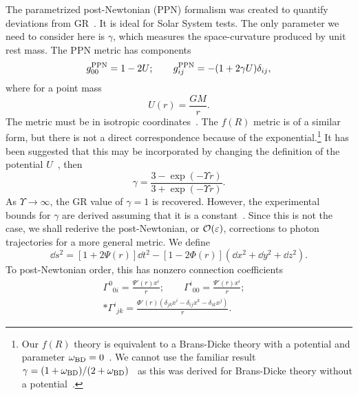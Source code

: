 The parametrized post-Newtonian (PPN) formalism was created to quantify deviations from GR~\cite{Will1993, Will2006}. It is ideal for Solar System tests. The only parameter we need to consider here is $\gamma$, which measures the space-curvature produced by unit rest mass. The PPN metric has components
\begin{equation}
g^\mathrm{PPN}_{00} = 1 - 2U; \qquad g^\mathrm{PPN}_{ij} = -(1 + 2\gamma U)\delta_{ij},
\end{equation}
where for a point mass
\begin{equation}
U(r) = \frac{GM}{r}.
\end{equation}
The metric must be in isotropic coordinates~\cite{Misner1973,Will1993}. The $f(R)$ metric  is of a similar form, but there is not a direct correspondence because of the exponential.\footnote{Our $f(R)$ theory is equivalent to a Brans-Dicke theory with a potential and parameter $\omega_\mathrm{BD} = 0$~\cite{Teyssandier1983, Wands1994}. We cannot use the familiar result $\gamma = (1 + \omega_\mathrm{BD})/(2 + \omega_\mathrm{BD})$~\cite{Will2006} as this was derived for Brans-Dicke theory without a potential~\cite{Will1993}.} It has been suggested that this may be incorporated by changing the definition of the potential $U$~\cite{Olmo2007c, Faulkner2007, Bisabr2010, DeFelice2010}, then
\begin{equation}
\gamma = \frac{3 - \exp(-\Upsilon r)}{3 + \exp(-\Upsilon r)}.
\end{equation}
As $\Upsilon \rightarrow \infty$, the GR value of $\gamma = 1$ is recovered. However, the experimental bounds for $\gamma$ are derived assuming that it is a constant~\cite{Will1993}. Since this is not the case, we shall rederive the post-Newtonian, or $\mathcal{O}({\varepsilon})$, corrections to photon trajectories for a more general metric. We define
\begin{equation}
\dd s^2 = \left[1+2\Psi(r)\right]\dd t^2 - \left[1 - 2\Phi(r)\right]\left(\dd x^2 + \dd y^2 + \dd z^2\right).
\end{equation}
To post-Newtonian order, this has nonzero connection coefficients
\begin{equation}
\begin{split}
{\Gamma^0}_{0i} = \frac{\Psi'(r) x^i}{r}; \qquad {\Gamma^i}_{00} = \frac{\Psi'(r) x^i}{r}; \quad\\*
{\Gamma^i}_{jk} = \frac{\Phi'(r)\left(\delta_{jk}x^i - \delta_{ij}x^k - \delta_{ik}x^j\right)}{r}.
\end{split}
\end{equation}

